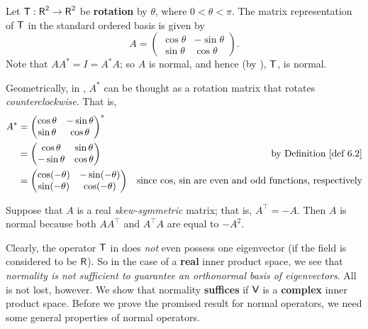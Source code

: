 \begin{example} \label{example 6.4.1}
Let \(\textsf{T}: \textsf{R}^2 \to \textsf{R}^2\) be \textbf{rotation} by \(\theta\), where \(0 < \theta < \pi\).
The matrix representation of \(\textsf{T}\) in the standard ordered basis is given by
\[
    A = \begin{pmatrix}
        \cos \theta & -\sin \theta \\
        \sin \theta & \cos \theta
    \end{pmatrix}.
\]
Note that \(A A^* = I = A^* A\); so \(A\) is normal, and hence (by ), \(\textsf{T}\), is normal.
\end{example}

\begin{remark} \label{remark 6.4.3}
Geometrically, in , \(A^*\) can be thought as a rotation matrix that rotates \emph{counterclockwise}.
That is,
\begin{align*}
    A^* & = \begin{pmatrix}
        \cos \theta & -\sin \theta \\
        \sin \theta & \cos \theta
    \end{pmatrix}^* \\
    & = \begin{pmatrix}
        \cos \theta & \sin \theta \\
        -\sin \theta & \cos \theta
    \end{pmatrix} & \text{by \DEF{6.2}} \\
    & = \begin{pmatrix}
        \cos (-\theta) & -\sin (-\theta) \\
        \sin (-\theta) & \cos (-\theta)
    \end{pmatrix} & \text{since \(\cos\), \(\sin\) are even and odd functions, respectively}
\end{align*}
\end{remark}

\begin{example} \label{example 6.4.2}
Suppose that \(A\) is a real \emph{skew-symmetric} matrix; that is, \(A^\top = -A\).
Then \(A\) is normal because both \(A A^\top\) and \(A^\top A\) are equal to \(-A^2\).
\end{example}

Clearly, the operator \(\textsf{T}\) in  does \emph{not} even possess one eigenvector (if the field is considered to be \(\textsf{R}\)).
So in the case of a \textbf{real} inner product space, we see that \emph{normality is not sufficient to guarantee an orthonormal basis of eigenvectors}.
All is not lost, however.
We show that normality \textbf{suffices} if \(\textsf{V}\) is a \textbf{complex} inner product space.
Before we prove the promised result for normal operators, we need some general properties of normal operators.

